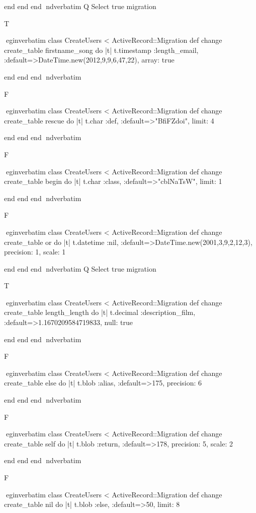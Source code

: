     end 
  end 
end
nd{verbatim}
Q
 Select true migration

T

egin{verbatim}
 class CreateUsers < ActiveRecord::Migration 
  def change 
    create_table firstname_song do |t| 
      t.timestamp :length_email, :default=>DateTime.new(2012,9,9,6,47,22), array: true
    
    end 
  end 
end
nd{verbatim}

F

egin{verbatim}
 class CreateUsers < ActiveRecord::Migration 
  def change 
    create_table rescue do |t| 
      t.char :def, :default=>"BfiFZdoi", limit: 4
    
    end 
  end 
end
nd{verbatim}

F

egin{verbatim}
 class CreateUsers < ActiveRecord::Migration 
  def change 
    create_table begin do |t| 
      t.char :class, :default=>"cblNaTsW", limit: 1
    
    end 
  end 
end
nd{verbatim}

F

egin{verbatim}
 class CreateUsers < ActiveRecord::Migration 
  def change 
    create_table or do |t| 
      t.datetime :nil, :default=>DateTime.new(2001,3,9,2,12,3), precision: 1, scale: 1
    
    end 
  end 
end
nd{verbatim}
Q
 Select true migration

T

egin{verbatim}
 class CreateUsers < ActiveRecord::Migration 
  def change 
    create_table length_length do |t| 
      t.decimal :description_film, :default=>1.1670209584719833, null: true
    
    end 
  end 
end
nd{verbatim}

F

egin{verbatim}
 class CreateUsers < ActiveRecord::Migration 
  def change 
    create_table else do |t| 
      t.blob :alias, :default=>175, precision: 6
    
    end 
  end 
end
nd{verbatim}

F

egin{verbatim}
 class CreateUsers < ActiveRecord::Migration 
  def change 
    create_table self do |t| 
      t.blob :return, :default=>178, precision: 5, scale: 2
    
    end 
  end 
end
nd{verbatim}

F

egin{verbatim}
 class CreateUsers < ActiveRecord::Migration 
  def change 
    create_table nil do |t| 
      t.blob :else, :default=>50, limit: 8
    
